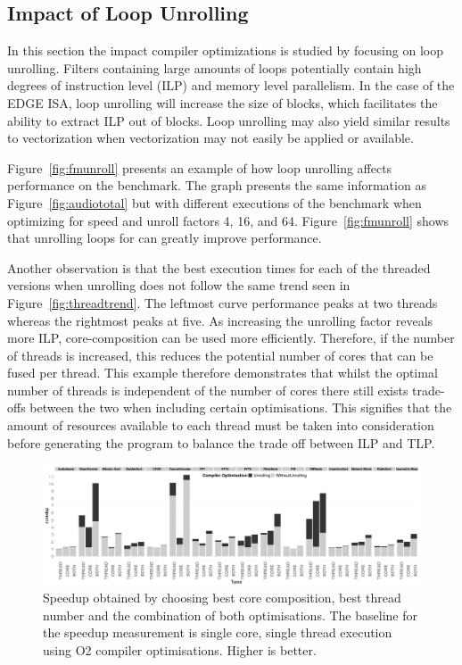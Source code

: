 \subsection{Impact of Loop Unrolling}
In this section the impact compiler optimizations is studied by focusing on loop unrolling.
Filters containing large amounts of loops potentially contain high degrees of instruction level (ILP) and memory level parallelism.
In the case of the EDGE ISA, loop unrolling will increase the size of blocks, which facilitates the ability to extract ILP out of blocks.
Loop unrolling may also yield similar results to vectorization when vectorization may not easily be applied or available.

Figure~\ref{fig:fmunroll} presents an example of how loop unrolling affects performance on the  benchmark.
The graph presents the same information as Figure~\ref{fig:audiototal} but with different executions of the benchmark when optimizing for speed and unroll factors 4, 16, and 64.
Figure~\ref{fig:fmunroll} shows that unrolling loops for  can greatly improve performance.

Another observation is that the best execution times for each of the threaded versions when unrolling does not follow the same trend seen in Figure~\ref{fig:threadtrend}.
The leftmost curve performance peaks at two threads whereas the rightmost peaks at five.
As increasing the unrolling factor reveals more ILP, core-composition can be used more efficiently.
Therefore, if the number of threads is increased, this reduces the potential number of cores that can be fused per thread.
This example therefore demonstrates that whilst the optimal number of threads is independent of the number of cores there still exists trade-offs between the two when including certain optimisations.
This signifies that the amount of resources available to each thread must be taken into consideration before generating the program to balance the trade off between ILP and TLP.

\begin{landscape}
\begin{figure}\hspace{-1em}
    \includegraphics[width=1\linewidth,keepaspectratio]{streamit-paper/graphics/threadcompbench.pdf}
    \caption{Speedup obtained by choosing best core composition, best
      thread number and the combination of both optimisations. The baseline for the speedup measurement is single core, single thread execution using O2 compiler optimisations. Higher
      is better.}\label{fig:overviewhist}
\end{figure}
\end{landscape}

